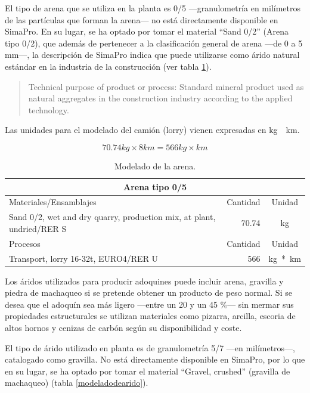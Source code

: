 El tipo de arena que se utiliza en la planta es 0/5 —granulometría en milímetros de las partículas que forman la arena— no está directamente disponible en SimaPro. En su lugar, se ha optado por tomar el material ``Sand 0/2'' (Arena tipo 0/2), que además de pertenecer a la clasificación general de arena —de 0 a 5 \si{mm}—, la descripción de SimaPro indica que puede utilizarse como árido natural estándar en la industria de la construcción (ver tabla \ref{modeladodelaarena}).

\begin{quote}
Technical purpose of product or process: Standard mineral product used as natural aggregates in the construction industry according to the applied technology.
\end{quote}

Las unidades para el modelado del camión (lorry) vienen expresadas en \si{kg\times km}.

\begin{equation}
70.74 kg \times 8 km = 566 kg\times km
\end{equation}

\begin{table}[!htb]
\centering
\begin{tabular}{p{8cm}rc}
\toprule
\multicolumn{3}{c}{Arena tipo 0/5}\\
\midrule
Materiales/Ensamblajes & Cantidad & Unidad\\
\midrule
Sand 0/2, wet and dry quarry, production mix, at plant, undried/RER S & 70.74 & \si{kg}\\
\midrule
Procesos & Cantidad & Unidad\\
\midrule
Transport, lorry 16-32t, EURO4/RER U & 566 & \si{kg*km}\\
\bottomrule
\end{tabular}
\caption{Modelado de la arena.}
\label{modeladodelaarena}
\end{table}

Los áridos utilizados para producir adoquines puede incluir arena, gravilla y piedra de machaqueo si se pretende obtener un producto de peso normal. Si se desea que el adoquín sea más ligero —entre un 20 y un 45 \%— sin mermar sus propiedades estructurales se utilizan materiales como pizarra, arcilla, escoria de altos hornos y cenizas de carbón según su disponibilidad y coste.

El tipo de árido utilizado en planta es de granulometría 5/7 —en milímetros—, catalogado como gravilla. No está directamente disponible en SimaPro, por lo que en su lugar, se ha optado por tomar el material ``Gravel, crushed'' (gravilla de machaqueo) (tabla \ref{modeladodearido}).


